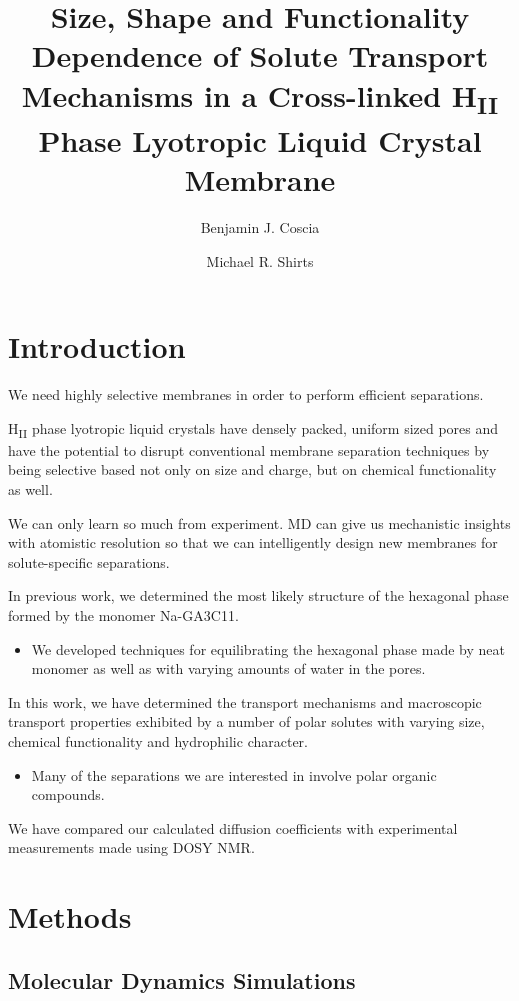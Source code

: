 \documentclass{article}
\title{Size, Shape and Functionality Dependence of Solute Transport Mechanisms in a Cross-linked H\textsubscript{II} Phase Lyotropic Liquid Crystal Membrane}
\author{Benjamin J. Coscia \and Michael R. Shirts}
\begin{document}
  \graphicspath{{./figures/}}
  \maketitle

  \section{Introduction}

  We need highly selective membranes in order to perform efficient separations.

  H\textsubscript{II} phase lyotropic liquid crystals have densely packed, uniform
  sized pores and have the potential to disrupt conventional membrane separation
  techniques by being selective based not only on size and charge, but on chemical
  functionality as well.

  We can only learn so much from experiment. MD can give us mechanistic insights with
  atomistic resolution so that we can intelligently design new membranes for 
  solute-specific separations.

  In previous work, we determined the most likely structure of the hexagonal phase 
  formed by the monomer Na-GA3C11.
  \begin{itemize}
  	\item We developed techniques for equilibrating the hexagonal phase made by
	neat monomer as well as with varying amounts of water in the pores.
  \end{itemize} 

  In this work, we have determined the transport mechanisms and macroscopic
  transport properties exhibited by a number of polar solutes with varying size,
  chemical functionality and hydrophilic character.
  \begin{itemize}
	\item Many of the separations we are interested in involve polar organic 
	compounds.
  \end{itemize} 

  We have compared our calculated diffusion coefficients with experimental
  measurements made using DOSY NMR. 

  \section{Methods}

  \subsection{Molecular Dynamics Simulations}
  
\end{document}

